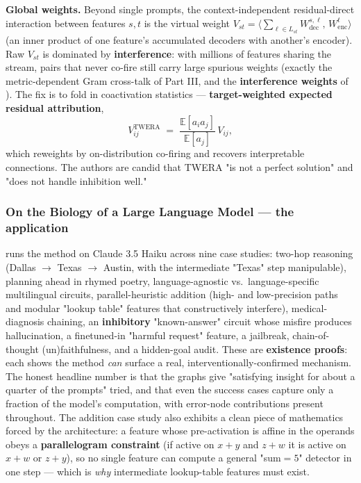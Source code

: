\textbf{Global weights.} Beyond single prompts, the context-independent residual-direct interaction between features $s,t$ is the virtual weight $V_{st}=\big\langle \sum_{\ell\in L_{st}} W_{\text{dec}}^{s,\ell},\, W_{\text{enc}}^{t}\big\rangle$ (an inner product of one feature's accumulated decoders with another's encoder). Raw $V_{st}$ is dominated by \textbf{interference}: with millions of features sharing the stream, pairs that never co-fire still carry large spurious weights (exactly the metric-dependent Gram cross-talk of Part III, and the \textbf{interference weights} of \textcite{toy-model-of-interference-weights}). The fix is to fold in coactivation statistics --- \textbf{target-weighted expected residual attribution},
\[
V_{ij}^{\text{TWERA}} \;=\; \frac{\mathbb E[a_i a_j]}{\mathbb E[a_j]}\, V_{ij},
\]
which reweights by on-distribution co-firing and recovers interpretable connections. The authors are candid that TWERA "is not a perfect solution" and "does not handle inhibition well."

\subsubsection*{On the Biology of a Large Language Model --- the application}

\textcite{on-the-biology-of-a-large-language-model} runs the method on Claude 3.5 Haiku across nine case studies: two-hop reasoning (Dallas $\to$ Texas $\to$ Austin, with the intermediate "Texas" step manipulable), planning ahead in rhymed poetry, language-agnostic vs.\ language-specific multilingual circuits, parallel-heuristic addition (high- and low-precision paths and modular "lookup table" features that constructively interfere), medical-diagnosis chaining, an \textbf{inhibitory} "known-answer" circuit whose misfire produces hallucination, a finetuned-in "harmful request" feature, a jailbreak, chain-of-thought (un)faithfulness, and a hidden-goal audit. These are \textbf{existence proofs}: each shows the method \emph{can} surface a real, interventionally-confirmed mechanism. The honest headline number is that the graphs give "satisfying insight for about a quarter of the prompts" tried, and that even the success cases capture only a fraction of the model's computation, with error-node contributions present throughout. The addition case study also exhibits a clean piece of mathematics forced by the architecture: a feature whose pre-activation is affine in the operands obeys a \textbf{parallelogram constraint} (if active on $x+y$ and $z+w$ it is active on $x+w$ or $z+y$), so no single feature can compute a general "sum$=5$" detector in one step --- which is \emph{why} intermediate lookup-table features must exist.

